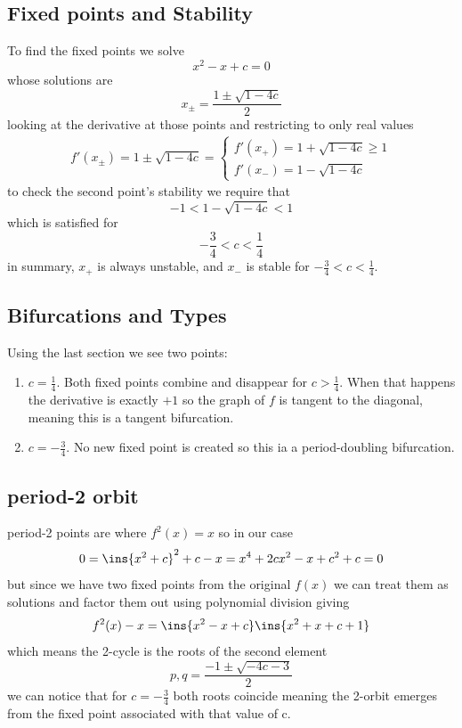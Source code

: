 \subsection{Fixed points and Stability}
To find the fixed points we solve 
\begin{equation}
	x^2-x+c=0
\end{equation}
whose solutions are 
\begin{equation}
	x_{\pm} = \frac{1\pm\sqrt{1-4c}}{2}
\end{equation}
looking at the derivative at those points and restricting to only real values
\begin{align}
	f'(x_\pm)=1\pm\sqrt{1-4c} = \begin{cases}
		f'(x_+) = 1+\sqrt{1-4c} \geq 1 \\
		f'(x_-) = 1-\sqrt{1-4c}
	\end{cases}
\end{align}
to check the second point's stability we require that 
\begin{equation}
	-1 < 1-\sqrt{1-4c} < 1
\end{equation}
which is satisfied for 
\begin{equation}
	-\frac{3}{4} < c < \frac{1}{4}
\end{equation}
in summary, \(x_+\) is always unstable, and \(x_-\) is stable for \(-\frac{3}{4} < c < \frac{1}{4}\).
\subsection{Bifurcations and Types}
Using the last section we see two points:
\begin{enumerate}
	\item \(c=\frac{1}{4}\). Both fixed points combine and disappear for \(c>\frac{1}{4}\). When that happens the derivative is exactly \(+1\) so the graph of \(f\) is tangent to the diagonal, meaning this is a tangent bifurcation.
	\item \(c=-\frac{3}{4}\). No new fixed point is created so this ia a period-doubling bifurcation.
\end{enumerate}
\subsection{period-2 orbit}
period-2 points are where \(f^2(x)=x\) so in our case 
\begin{equation}
	0=\ins{x^2+c}^2+c-x = x^4 +2cx^2 -x +c^2 +c=0
\end{equation}
but since we have two fixed points from the original \(f(x)\) we can treat them as solutions and factor them out using polynomial division giving
\begin{equation}
	f^2(x)-x = \ins{x^2-x+c}\ins{x^2+x+c+1}
\end{equation}
which means the 2-cycle is the roots of the second element 
\begin{equation}
	p,q = \frac{-1\pm\sqrt{-4c-3}}{2}
\end{equation}
we can notice that for \(c=-\frac{3}{4}\) both roots coincide meaning the 2-orbit emerges from the fixed point associated with that value of c.
